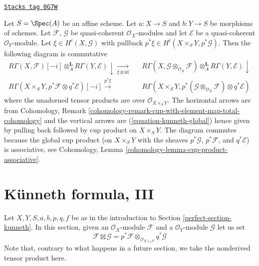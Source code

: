 \begin{remark}
\label{perfect-remark-annoying-compatibility}
\href{https://stacks.math.columbia.edu/tag/0G7W}{\texttt{Stacks tag 0G7W}}

Let $S = \Spec(A)$ be an affine scheme. Let $a : X \to S$
and $b : Y \to S$ be morphisms of schemes. Let $\mathcal{F}$, $\mathcal{G}$
be quasi-coherent $\mathcal{O}_X$-modules and let $\mathcal{E}$
be a quasi-coherent $\mathcal{O}_Y$-module. Let
$\xi \in H^i(X, \mathcal{G})$ with pullback
$p^*\xi \in H^i(X \times_S Y, p^*\mathcal{G})$.
Then the following diagram is commutative
$$
\begin{array}{ccc}R\Gamma(X, \mathcal{F})[-i] \otimes_A^\mathbf{L} R\Gamma(Y, \mathcal{E})
\downarrow\underset{\xi \otimes \text{id}}{\longrightarrow} &  & R\Gamma(X, \mathcal{G} \otimes_{\mathcal{O}_X} \mathcal{F})
\otimes_A^\mathbf{L} R\Gamma(Y, \mathcal{E}) \downarrow \\ R\Gamma(X \times_S Y, p^*\mathcal{F} \otimes q^*\mathcal{E})[-i]
\overset{p^*\xi}{\longrightarrow} &  & R\Gamma(X \times_S Y,
p^*(\mathcal{G} \otimes_{\mathcal{O}_X} \mathcal{F}) \otimes q^*\mathcal{E})\end{array}
$$
where the unadorned tensor products are over $\mathcal{O}_{X \times_S Y}$.
The horizontal arrows are from Cohomology, Remark
\ref{cohomology-remark-cup-with-element-map-total-cohomology}
and the vertical arrows are (\ref{equation-kunneth-global})
hence given by pulling back followed by cup product on $X \times_S Y$.
The diagram commutes because the global cup product (on $X \times_S Y$
with the sheaves $p^*\mathcal{G}$, $p^*\mathcal{F}$, and $q^*\mathcal{E}$)
is associative, see
Cohomology, Lemma \ref{cohomology-lemma-cup-product-associative}.
\end{remark}

\section{K\"unneth formula, III}
\label{perfect-section-kunneth-complexes}
Let $X, Y, S, a, b, p, q, f$ be as in the introduction to
Section \ref{perfect-section-kunneth}. In this section, given an
$\mathcal{O}_X$-module $\mathcal{F}$ and a $\mathcal{O}_Y$-module
$\mathcal{G}$ let us set
$$
\mathcal{F} \boxtimes \mathcal{G} =
p^*\mathcal{F} \otimes_{\mathcal{O}_{X \times_S Y}} q^*\mathcal{G}
$$
Note that, contrary to what happens in a future section, we take
the nonderived tensor product here.

